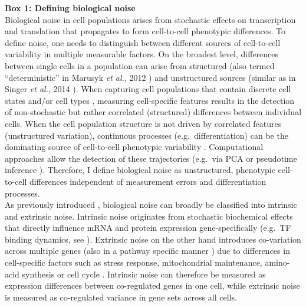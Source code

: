 \begin{Comment}
\hspace{-2.5mm}\textbf{Box 1: Defining biological noise}\label{box1}\\
\small
Biological noise in cell populations arises from stochastic effects on transcription and translation that propagates to form cell-to-cell phenotypic differences. 
To define noise, one needs to distinguish between different sources of cell-to-cell variability in multiple measurable factors. 
On the broadest level, differences between single cells in a population can arise from structured (also termed “deterministic” in Marusyk \emph{et al.}, 2012 \citep{Marusyk2012}) and unstructured sources (similar as in Singer \emph{et al.}, 2014 \citep{Singer2014}). 
When capturing cell populations that contain discrete cell states and/or cell types \citep{Paul2015, Ibarra-Soria2018, Rosenberg2018}, measuring cell-specific features results in the detection of non-stochastic but rather correlated (structured) differences between individual cells. 
When the cell population structure is not driven by correlated features (unstructured variation), continuous processes (e.g.~differentiation) can be the dominating source of cell-to-cell phenotypic variability \citep{Dahlin2018}. 
Computational approaches allow the detection of these trajectories (e.g.~via \gls{PCA} or pseudotime inference \citep{Trapnell2014, Angerer2015}). 
Therefore, I define biological noise as unstructured, phenotypic cell-to-cell differences independent of measurement errors and differentiation processes. \\

As previously introduced \citep{Elowitz2002}, biological noise can broadly be classified into intrinsic and extrinsic noise. 
Intrinsic noise originates from stochastic biochemical effects that directly influence mRNA and protein expression gene-specifically (e.g.~\gls{TF} binding dynamics, see \citep{Swain2002}). 
Extrinsic noise on the other hand introduces co-variation across multiple genes (also in a pathway specific manner \citep{Raser2005}) due to differences in cell-specific factors such as stress response, mitochondrial maintenance, amino-acid synthesis \citep{Stewart-Ornstein2012} or cell cycle \citep{Zopf2013}. 
Intrinsic noise can therefore be measured as expression differences between co-regulated genes in one cell, while extrinsic noise is measured as co-regulated variance in gene sets across all cells.
\end{Comment}

